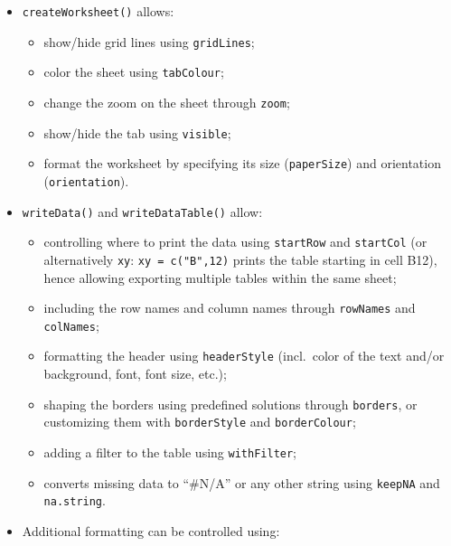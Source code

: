 \documentclass[
]{book}
\providecommand{\tightlist}{%
  \setlength{\itemsep}{0pt}\setlength{\parskip}{0pt}}
\begin{document}
\begin{itemize}
\tightlist
\item
  \texttt{createWorksheet()} allows:

  \begin{itemize}
  \tightlist
  \item
    show/hide grid lines using \texttt{gridLines};
  \item
    color the sheet using \texttt{tabColour};
  \item
    change the zoom on the sheet through \texttt{zoom};
  \item
    show/hide the tab using \texttt{visible};
  \item
    format the worksheet by specifying its size (\texttt{paperSize}) and orientation (\texttt{orientation}).
  \end{itemize}
\item
  \texttt{writeData()} and \texttt{writeDataTable()} allow:

  \begin{itemize}
  \tightlist
  \item
    controlling where to print the data using \texttt{startRow} and \texttt{startCol} (or alternatively \texttt{xy}: \texttt{xy\ =\ c("B",12)} prints the table starting in cell B12), hence allowing exporting multiple tables within the same sheet;
  \item
    including the row names and column names through \texttt{rowNames} and \texttt{colNames};
  \item
    formatting the header using \texttt{headerStyle} (incl.~color of the text and/or background, font, font size, etc.);
  \item
    shaping the borders using predefined solutions through \texttt{borders}, or customizing them with \texttt{borderStyle} and \texttt{borderColour};
  \item
    adding a filter to the table using \texttt{withFilter};
  \item
    converts missing data to ``\#N/A'' or any other string using \texttt{keepNA} and \texttt{na.string}.
  \end{itemize}
\item
  Additional formatting can be controlled using:


\end{itemize}
\end{document}
